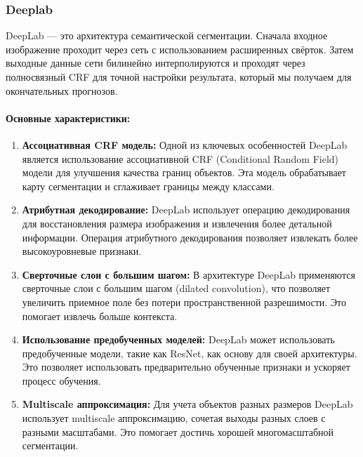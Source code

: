 \documentclass[11pt]{article}
\providecommand{\tightlist}{%
      \setlength{\itemsep}{0pt}\setlength{\parskip}{0pt}}
\begin{document}
    \hypertarget{deeplab}{%
\subsubsection{Deeplab}\label{deeplab}}

DeepLab --- это архитектура семантической сегментации. Сначала входное
изображение проходит через сеть с использованием расширенных свёрток.
Затем выходные данные сети билинейно интерполируются и проходят через
полносвязный CRF для точной настройки результата, который мы получаем
для окончательных прогнозов.

\hypertarget{ux43eux441ux43dux43eux432ux43dux44bux435-ux445ux430ux440ux430ux43aux442ux435ux440ux438ux441ux442ux438ux43aux438}{%
\paragraph{Основные
характеристики:}\label{ux43eux441ux43dux43eux432ux43dux44bux435-ux445ux430ux440ux430ux43aux442ux435ux440ux438ux441ux442ux438ux43aux438}}

\begin{enumerate}
\def\labelenumi{\arabic{enumi}.}
\tightlist
\item
  \textbf{Ассоциативная CRF модель:} Одной из ключевых особенностей
  DeepLab является использование ассоциативной CRF (Conditional Random
  Field) модели для улучшения качества границ объектов. Эта модель
  обрабатывает карту сегментации и сглаживает границы между классами.
\item
  \textbf{Атрибутная декодирование:} DeepLab использует операцию
  декодирования для восстановления размера изображения и извлечения
  более детальной информации. Операция атрибутного декодирования
  позволяет извлекать более высокоуровневые признаки.
\item
  \textbf{Сверточные слои с большим шагом:} В архитектуре DeepLab
  применяются сверточные слои с большим шагом (dilated convolution), что
  позволяет увеличить приемное поле без потери пространственной
  разрешимости. Это помогает извлечь больше контекста.
\item
  \textbf{Использование предобученных моделей:} DeepLab может
  использовать предобученные модели, такие как ResNet, как основу для
  своей архитектуры. Это позволяет использовать предварительно обученные
  признаки и ускоряет процесс обучения.
\item
  \textbf{Multiscale аппроксимация:} Для учета объектов разных размеров
  DeepLab использует multiscale аппроксимацию, сочетая выходы разных
  слоев с разными масштабами. Это помогает достичь хорошей
  многомасштабной сегментации.
\end{enumerate}
\end{document}
